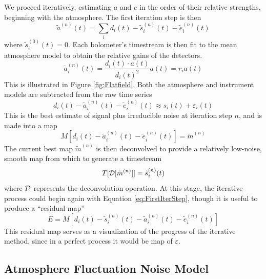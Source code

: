 \documentclass[12pt,preprint]{aastex}
\newcommand{\epsi}{\varepsilon}
\begin{document}
We proceed iteratively, estimating $a$ and $e$ in the order of their
relative strengths, beginning with the atmosphere.  The first
iteration step is then
\begin{equation}
\label{eq:FirstIterStep}
\tilde{a}^{(n)}(t) = 
\sum_i{d_i(t)-\tilde{s}^{(n)}_i(t) - \tilde{e}^{(n)}_i(t)}
\end{equation}
where $\tilde{s}^{(0)}_i(t)=0$.   Each bolometer's timestream is then 
fit to the mean atmosphere model to obtain the relative gains of the detectors.
\begin{equation}
\tilde{a}^{(n)}_i(t) = \frac{d_i(t) \cdot a(t)}{d_i(t)^2} a(t) = r_i a(t)
\end{equation}
This is illustrated in Figure \ref{fig:Flatfield}.  
Both the atmosphere and instrument models are subtracted from the
raw time series
\begin{equation}
d_i(t) - \tilde{a}^{(n)}_i(t) - \tilde{e}^{(n)}_i(t)
\approx s_i(t) + \epsi_i(t)
\end{equation}
This is the best estimate of signal plus irreducible noise at
iteration step $n$, and is made into a map
\begin{equation}
M[d_i(t) - \tilde{a}^{(n)}_i(t) - \tilde{e}^{(n)}_i(t)] = \tilde{m}^{(n)}
\end{equation}
The current best map $\tilde{m}^{(n)}$ is then deconvolved to provide
a relatively low-noise, smooth map from which to generate a timestream
\begin{equation}
\label{eq:MapToTime}
T[{\cal D}[\tilde{m}^{(n)}]] = \tilde{s}^{(n)}_i(t)
\end{equation}
where ${\cal D}$ represents the deconvolution operation.  At this
stage, the iterative process could begin again with Equation
\ref{eq:FirstIterStep}, though it is useful to produce a
``residual map''
\begin{equation}
E = M[d_i(t) - \tilde{s}^{(n)}_i(t) - \tilde{a}^{(n)}_i(t) - 
\tilde{e}^{(n)}_i(t)]
\end{equation}
This residual map serves as a visualization of the progress of the iterative
method, since in a perfect process it would be map of $\epsi$.

\subsection{Atmosphere Fluctuation Noise Model}
\end{document}
